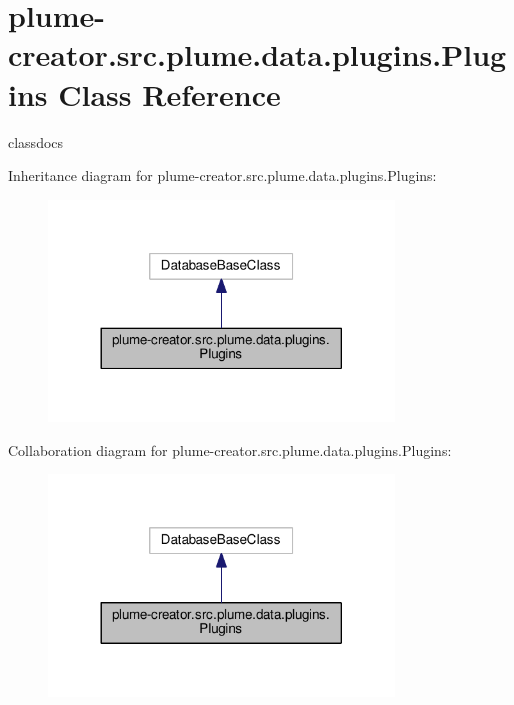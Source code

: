 \hypertarget{classplume-creator_1_1src_1_1plume_1_1data_1_1plugins_1_1_plugins}{}\section{plume-\/creator.src.\+plume.\+data.\+plugins.\+Plugins Class Reference}
\label{classplume-creator_1_1src_1_1plume_1_1data_1_1plugins_1_1_plugins}


classdocs  




Inheritance diagram for plume-\/creator.src.\+plume.\+data.\+plugins.\+Plugins\+:\nopagebreak
\begin{figure}[H]
\begin{center}
\leavevmode
\includegraphics[width=260pt]{classplume-creator_1_1src_1_1plume_1_1data_1_1plugins_1_1_plugins__inherit__graph}
\end{center}
\end{figure}


Collaboration diagram for plume-\/creator.src.\+plume.\+data.\+plugins.\+Plugins\+:\nopagebreak
\begin{figure}[H]
\begin{center}
\leavevmode
\includegraphics[width=260pt]{classplume-creator_1_1src_1_1plume_1_1data_1_1plugins_1_1_plugins__coll__graph}
\end{center}
\end{figure}

